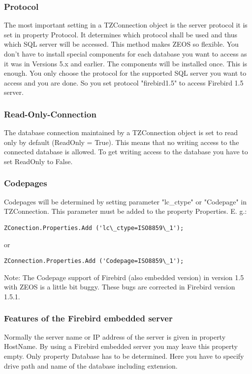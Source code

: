 \documentclass[a4paper,12pt,oneside]{book}
\begin{document}
\subsubsection{Protocol}
The most important setting in a TZConnection object is the server protocol it is set in property Protocol.
It determines which protocol shall be used and thus which SQL server will be accessed.
This method makes ZEOS so flexible.
You don't have to install special components for each database you want to access as it was in Versions 5.x and earlier.
The components will be installed once.
This is enough.
You only choose the protocol for the supported SQL server you want to access and you are done.
So you set protocol "firebird1.5" to access Firebird 1.5 server.

\subsubsection{Read-Only-Connection}

The database connection maintained by a TZConnection object is set to read only by default (ReadOnly = True).
This means that no writing access to the connected database is allowed.
To get writing access to the database you have to set ReadOnly to False.

\subsubsection{Codepages}
Codepages will be determined by setting parameter "lc\_ctype" or "Codepage" in TZConnection.
This parameter must be added to the property Properties. E. g.:
\begin{verbatim}
ZConection.Properties.Add ('lc\_ctype=ISO8859\_1');
\end{verbatim}
or
\begin{verbatim}
ZConnection.Properties.Add ('Codepage=ISO8859\_1');
\end{verbatim}

Note: The Codepage support of Firebird (also embedded version) in version 1.5 with ZEOS is a little bit buggy. These bugs are corrected in Firebird version 1.5.1.

\subsubsection{Features of the Firebird embedded server}

Normally the server name or IP address of the server is given in property HostName.
By using a Firebird embedded server you may leave this property empty.
Only property Database has to be determined.
Here you have to specify drive path and name of the database including extension.
\end{document}

